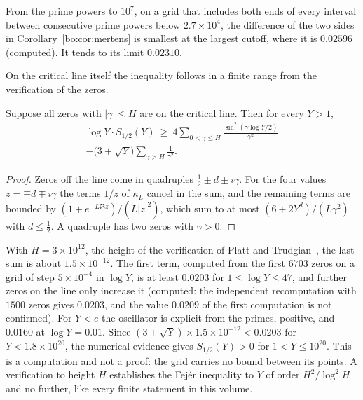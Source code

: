 \begin{computation}\label{bo:comp:mertens}
From the prime powers to $10^7$, on a grid that includes both ends of every interval between consecutive prime powers below $2.7\times10^4$, the difference of the two sides in Corollary~\ref{bo:cor:mertens} is smallest at the largest cutoff, where it is $0.02596$ (computed). It tends to its limit $0.02310$.
\end{computation}

On the critical line itself the inequality follows in a finite range from the verification of the zeros.

\begin{proposition}\label{bo:prop:finite}
Suppose all zeros with $|\gamma|\le H$ are on the critical line. Then for every $Y>1$,
\begin{multline*}
\log Y\cdot S_{1/2}(Y)\ \ge\ 4\sum_{0<\gamma\le H}\frac{\sin^2(\gamma\log Y/2)}{\gamma^2}\\
-\bigl(3+\sqrt Y\bigr)\sum_{\gamma>H}\frac1{\gamma^2}.
\end{multline*}
\end{proposition}

\begin{proof}
Zeros off the line come in quadruples $\frac12\pm d\pm i\gamma$. For the four values $z=\mp d\mp i\gamma$ the terms $1/z$ of $\kappa_L$ cancel in the sum, and the remaining terms are bounded by $(1+e^{-L\Re z})/(L|z|^2)$, which sum to at most $(6+2Y^{d})/(L\gamma^2)$ with $d\le\frac12$. A quadruple has two zeros with $\gamma>0$.
\end{proof}

With $H=3\times10^{12}$, the height of the verification of Platt and Trudgian~\cite{PT21}, the last sum is about $1.5\times10^{-12}$. The first term, computed from the first $6703$ zeros on a grid of step $5\times10^{-4}$ in $\log Y$, is at least $0.0203$ for $1\le\log Y\le47$, and further zeros on the line only increase it (computed: the independent recomputation with $1500$ zeros gives $0.0203$, and the value $0.0209$ of the first computation is not confirmed). For $Y<e$ the oscillator is explicit from the primes, positive, and $0.0160$ at $\log Y=0.01$. Since $(3+\sqrt Y)\times1.5\times10^{-12}<0.0203$ for $Y<1.8\times10^{20}$, the numerical evidence gives $S_{1/2}(Y)>0$ for $1<Y\le10^{20}$. This is a computation and not a proof: the grid carries no bound between its points. A verification to height $H$ establishes the Fej\'er inequality to $Y$ of order $H^2/\log^2H$ and no further, like every finite statement in this volume.

